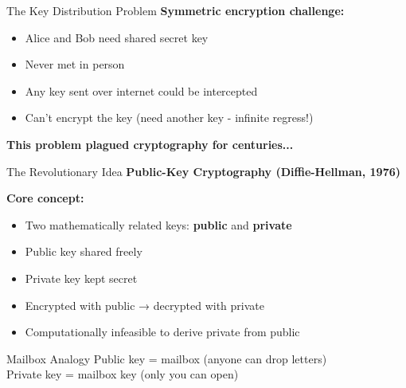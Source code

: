 \documentclass{beamer}
\begin{document}
\begin{frame}{The Key Distribution Problem}
\textbf{Symmetric encryption challenge:}

\begin{itemize}
    \item Alice and Bob need shared secret key
    \item Never met in person
    \item Any key sent over internet could be intercepted
    \item Can't encrypt the key (need another key - infinite regress!)
\end{itemize}

\vspace{0.5cm}
\textbf{This problem plagued cryptography for centuries...}

\end{frame}

\begin{frame}{The Revolutionary Idea}
\textbf{Public-Key Cryptography (Diffie-Hellman, 1976)}

\vspace{0.3cm}
\textbf{Core concept:}
\begin{itemize}
    \item Two mathematically related keys: \textbf{public} and \textbf{private}
    \item Public key shared freely
    \item Private key kept secret
    \item Encrypted with public → decrypted with private
    \item Computationally infeasible to derive private from public
\end{itemize}

\vspace{0.3cm}
\begin{block}{Mailbox Analogy}
Public key = mailbox (anyone can drop letters)\\
Private key = mailbox key (only you can open)
\end{block}

\end{frame}
\end{document}
